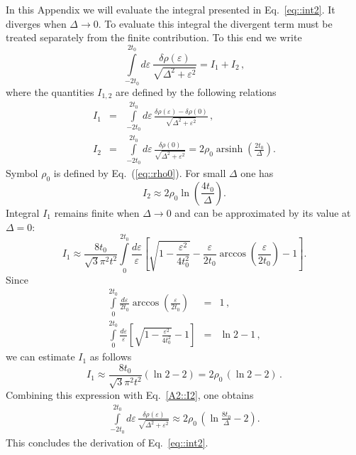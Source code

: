 \documentclass[prb,twocolumn,showpacs,aps,superscriptaddress,floatfix]{revtex4}
\DeclareMathOperator{\arsinh}{arsinh}
\begin{document}
In this Appendix we will evaluate the integral presented in
Eq.~\eqref{eq::int2}.
It diverges when
$\Delta\to0$.
To evaluate this integral the divergent term must be treated separately
from the finite contribution. To this end we write
\begin{equation}\label{eq::split_integral}
\int\limits_{-2t_0}^{2t_0}\!\!\!d\varepsilon\,\frac{\delta\rho(\varepsilon)}{\sqrt{\Delta^2+\varepsilon^2}}=I_1+I_2\,,
\end{equation}
where the quantities
$I_{1,2}$
are defined by the following relations
\begin{eqnarray}
I_1
&=&\!\!\!\!
\int\limits_{-2t_0}^{2t_0}\!\!\!d\varepsilon\,
	\frac{
		\delta\rho(\varepsilon)-\delta\rho(0)
	     }
	     {
		\sqrt{\Delta^2+\varepsilon^2}
	     }\,,
\\
I_2
&=&\!\!\!\!
\int\limits_{-2t_0}^{2t_0}\!\!\!d\varepsilon\,
	\frac{\delta\rho(0)}{\sqrt{\Delta^2+\varepsilon^2}}
=
2\rho_0\arsinh\left(\frac{2t_0}{\Delta}\right).
\end{eqnarray}
Symbol
$\rho_0$
is defined by
Eq.~(\ref{eq::rho0}).
For small $\Delta$ one has
\begin{equation}\label{A2::I2}
I_2\approx2\rho_0\ln\left(\dfrac{4t_0}{\Delta}\right).
\end{equation}
Integral
$I_1$
remains finite when
$\Delta\to0$
and can be approximated by its value at
$\Delta=0$:
\begin{equation}
I_1\approx\frac{8t_0}{\sqrt{3}\pi^2t^2}\!\int\limits_{0}^{2t_0}\!\frac{d\varepsilon}{\varepsilon}\left[\sqrt{1-\frac{\varepsilon^2}{4t^2_0}}
-\frac{\varepsilon}{2t_0}\arccos\!\left(\!\dfrac{\varepsilon}{2t_0}\!\right)-1\right].
\end{equation}
Since
\begin{eqnarray}
\int\limits_{0}^{2t_0}\!\frac{d\varepsilon}{2t_0}\arccos \left(\frac{\varepsilon}{2t_0}\right)&=&1\,,\\
\int\limits_{0}^{2t_0}\!\frac{d\varepsilon}{\varepsilon}\left[\sqrt{1-\frac{\varepsilon^2}{4t^2_0}}-1	 \right]&=&\ln 2 -1\,,
\end{eqnarray}
we can estimate
$I_1$
as follows
\begin{equation}
I_1\approx\frac{8t_0}{\sqrt{3}\pi^2t^2}(\ln2-2)=2\rho_0\,(\ln2-2)\,.
\end{equation}
Combining this expression with
Eq.~\eqref{A2::I2},
one obtains
\begin{eqnarray}
\int\limits_{-2t_0}^{2t_0}\!\!\!d\varepsilon\,
	\frac{\delta\rho(\varepsilon)}{\sqrt{\Delta^2+\varepsilon^2}}
\approx
2\rho_0\,\left(\ln\frac{8t_0}{\Delta}-2\right).
\end{eqnarray}
This concludes the derivation of
Eq.~\eqref{eq::int2}.
\end{document}
